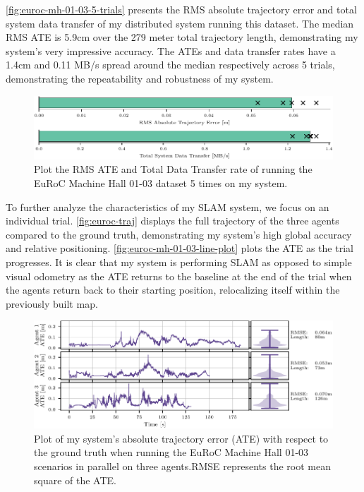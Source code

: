 \autoref{fig:euroc-mh-01-03-5-trials} presents the RMS absolute trajectory error and total system data transfer of my distributed system running this dataset. The median RMS ATE is 5.9cm over the 279 meter total trajectory length, demonstrating my system's very impressive accuracy. The ATEs and data transfer rates have a 1.4cm and 0.11 MB/s spread around the median respectively across 5 trials, demonstrating the repeatability and robustness of my system.

\begin{figure}[h]
    \centering
    \includegraphics[width=0.8\linewidth]{figures/comparison_apr11_mh_trajectory_b.pdf}

    \caption{Plot the RMS ATE and Total Data Transfer rate of running the EuRoC Machine Hall 01-03 dataset 5 times on my system.}
    \label{fig:euroc-mh-01-03-5-trials}
\end{figure}

To further analyze the characteristics of my SLAM system, we focus on an individual trial. \autoref{fig:euroc-traj} displays the full trajectory of the three agents compared to the ground truth, demonstrating my system's high global accuracy and relative positioning. \autoref{fig:euroc-mh-01-03-line-plot} plots the ATE as the trial progresses. It is clear that my system is performing SLAM as opposed to simple visual odometry as the ATE returns to the baseline at the end of the trial when the agents return back to their starting position, relocalizing itself within the previously built map.

\begin{figure}[h]
    \centering
    \includegraphics[width=0.9\linewidth]{figures/apr11_mh_trajectory_b_line_plot.pdf}

    \caption{Plot of my system's absolute trajectory error (ATE) with respect to the ground truth when running the EuRoC Machine Hall 01-03 scenarios in parallel on three agents.\captionbreak RMSE represents the root mean square of the ATE.}
    \label{fig:euroc-mh-01-03-line-plot}
\end{figure}

